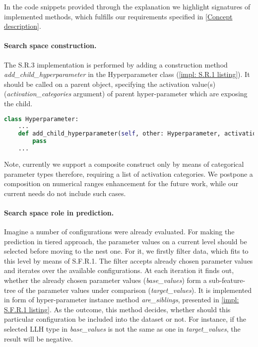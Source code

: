 In the code snippets provided through the explanation we highlight signatures of implemented methods, which fulfills our requirements specified in \cref{Concept description}.

\paragraph{Search space construction.} The S.R.3 implementation is performed by adding a construction method \emph{add\_child\_hyperparameter} in the Hyperparameter class (\cref{impl: S.R.1 listing}). It should be called on a parent object, specifying the activation value(s) (\emph{activation\_categories} argument) of parent hyper-parameter which are exposing the child. 

\begin{lstlisting}[language=Python, caption=S.R.1 implementation., label=impl: S.R.1 listing]
class Hyperparameter:
	...
	def add_child_hyperparameter(self, other: Hyperparameter, activation_categories: Iterable[CATEGORY]) -> Hyperparameter:
		pass
	...
\end{lstlisting}

Note, currently we support a composite construct only by means of categorical parameter types therefore, requiring a list of activation categories. We postpone a composition on numerical ranges enhancement for the future work, while our current needs do not include such cases.

\paragraph{Search space role in prediction.}
Imagine a number of configurations were already evaluated. For making the prediction in tiered approach, the parameter values on a current level should be selected before moving to the nest one. For it, we firstly filter data, which fits to this level by means of S.F.R.1. The filter accepts already chosen parameter values and iterates over the available configurations. At each iteration it finds out, whether the already chosen parameter values (\emph{base\_values}) form a sub-feature-tree of the parameter values under comparison (\emph{target\_values}). It is implemented in form of hyper-parameter instance method \emph{are\_siblings}, presented in \cref{impl: S.F.R.1 listing}. As the outcome, this method decides, whether should this particular configuration be included into the dataset or not. For instance, if the selected LLH type in \emph{base\_values} is not the same as one in \emph{target\_values}, the result will be negative.

